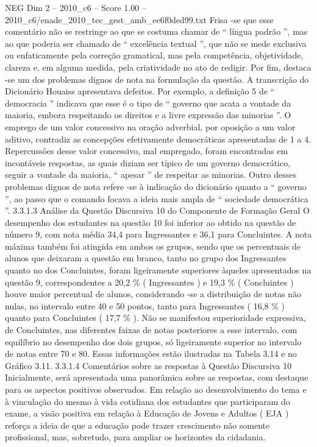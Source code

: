 \begin{textsample}{NEG Dim 2 – 2010\_c6 – Score 1.00 – 2010\_c6/enade\_2010\_tec\_gest\_amb\_ee6f0ded99.txt}
Frisa -se que esse comentário não se restringe ao que se costuma chamar de “ língua padrão ”, mas ao que poderia ser chamado de “ excelência textual ”, que não se mede exclusiva ou enfaticamente pela correção gramatical, mas pela competência, objetividade, clareza e, em alguma medida, pela criatividade no ato de redigir.
Por fim, destaca -se um dos problemas dignos de nota na formulação da questão.
A transcrição do Dicionário Houaiss apresentava defeitos.
Por exemplo, a definição 5 de “ democracia ” indicava que esse é o tipo de “ governo que acata a vontade da maioria, embora respeitando os direitos e a livre expressão das minorias ”.
O emprego de um valor concessivo na oração adverbial, por oposição a um valor aditivo, contradiz as concepções efetivamente democráticas apresentadas de 1 a 4.
Repercussões desse valor concessivo, mal empregado, foram encontradas em incontáveis respostas, as quais diziam ser típico de um governo democrático, seguir a vontade da maioria, “ apesar ” de respeitar as minorias.
Outro desses problemas dignos de nota refere -se à indicação do dicionário quanto a “ governo ”, ao passo que o comando focava a ideia mais ampla de “ sociedade democrática ”. 3.3.1.3 Análise da Questão Discursiva 10 do Componente de Formação Geral O desempenho dos estudantes na questão 10 foi inferior ao obtido na questão de número 9, com nota média 34,4 para Ingressantes e 36,1 para Concluintes.
A nota máxima também foi atingida em ambos os grupos, sendo que os percentuais de alunos que deixaram a questão em branco, tanto no grupo dos Ingressantes quanto no dos Concluintes, foram ligeiramente superiores àqueles apresentados na questão 9, correspondentes a 20,2 \% ( Ingressantes ) e 19,3 \% ( Concluintes ) houve maior percentual de alunos, considerando -se a distribuição de notas não nulas, no intervalo entre 40 e 50 pontos, tanto para Ingressantes ( 16,8 \% ) quanto para Concluintes ( 17,7 \% ).
Não se manifestou superioridade expressiva, de Concluintes, nas diferentes faixas de notas posteriores a esse intervalo, com equilíbrio no desempenho dos dois grupos, só ligeiramente superior no intervalo de notas entre 70 e 80.
Essas informações estão ilustradas na Tabela 3.14 e no Gráfico 3.11. 3.3.1.4 Comentários sobre as respostas à Questão Discursiva 10 Inicialmente, será apresentada uma panorâmica sobre as respostas, com destaque para os aspectos positivos observados.
Em relação ao desenvolvimento do tema e à vinculação do mesmo à vida cotidiana dos estudantes que participaram do exame, a visão positiva em relação à Educação de Jovens e Adultos ( EJA ) reforça a ideia de que a educação pode trazer crescimento não somente profissional, mas, sobretudo, para ampliar os horizontes da cidadania.

\end{textsample}
